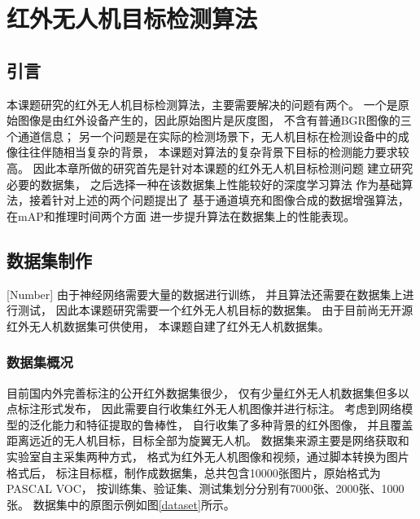 
\chapter{红外无人机目标检测算法}

\section{引言}
本课题研究的红外无人机目标检测算法，主要需要解决的问题有两个。
一个是原始图像是由红外设备产生的，因此原始图片是灰度图，
不含有普通BGR图像的三个通道信息；
另一个问题是在实际的检测场景下，无人机目标在检测设备中的成像往往伴随相当复杂的背景，
本课题对算法的复杂背景下目标的检测能力要求较高。
因此本章所做的研究首先是针对本课题的红外无人机目标检测问题
建立研究必要的数据集，
之后选择一种在该数据集上性能较好的深度学习算法
作为基础算法，接着针对上述的两个问题提出了
基于通道填充和图像合成的数据增强算法，
在mAP和推理时间两个方面
进一步提升算法在数据集上的性能表现。

\section{数据集制作}[Number]
由于神经网络需要大量的数据进行训练，
并且算法还需要在数据集上进行测试，
因此本课题研究需要一个红外无人机目标的数据集。
由于目前尚无开源红外无人机数据集可供使用，
本课题自建了红外无人机数据集。

\subsection{数据集概况}
目前国内外完善标注的公开红外数据集很少，
仅有少量红外无人机数据集但多以点标注形式发布，
因此需要自行收集红外无人机图像并进行标注。
考虑到网络模型的泛化能力和特征提取的鲁棒性，
自行收集了多种背景的红外图像，
并且覆盖距离远近的无人机目标，目标全部为旋翼无人机。
数据集来源主要是网络获取和实验室自主采集两种方式，
格式为红外无人机图像和视频，通过脚本转换为图片格式后，
标注目标框，制作成数据集，总共包含10000张图片，原始格式为PASCAL VOC，
按训练集、验证集、测试集划分分别有7000张、2000张、1000张。
数据集中的原图示例如图\ref{dataset}所示。

